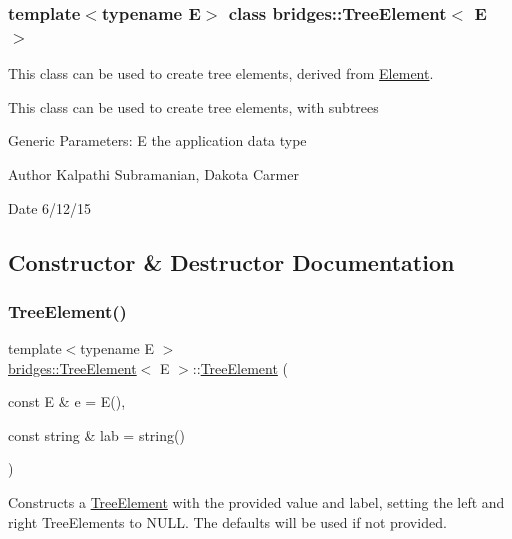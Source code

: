 \subsubsection*{template$<$typename E$>$\newline
class bridges\+::\+Tree\+Element$<$ E $>$}

This class can be used to create tree elements, derived from \mbox{\hyperlink{classbridges_1_1_element}{Element}}. 

This class can be used to create tree elements, with subtrees

Generic Parameters\+: E the application data type

\begin{DoxyAuthor}{Author}
Kalpathi Subramanian, Dakota Carmer 
\end{DoxyAuthor}
\begin{DoxyDate}{Date}
6/12/15 
\end{DoxyDate}


\subsection{Constructor \& Destructor Documentation}
\mbox{\label{classbridges_1_1_tree_element_a4e96ffab9a6c711ead687dd8a42e80a0}} 
\subsubsection{\texorpdfstring{Tree\+Element()}{TreeElement()}}
{\footnotesize\ttfamily template$<$typename E $>$ \\
\mbox{\hyperlink{classbridges_1_1_tree_element}{bridges\+::\+Tree\+Element}}$<$ E $>$\+::\mbox{\hyperlink{classbridges_1_1_tree_element}{Tree\+Element}} (\begin{DoxyParamCaption}\item[{const E \&}]{e = {\ttfamily E()},  }\item[{const string \&}]{lab = {\ttfamily string()} }\end{DoxyParamCaption})\hspace{0.3cm}{\ttfamily [inline]}}

Constructs a \mbox{\hyperlink{classbridges_1_1_tree_element}{Tree\+Element}} with the provided value and label, setting the left and right Tree\+Elements to N\+U\+LL. The defaults will be used if not provided.


